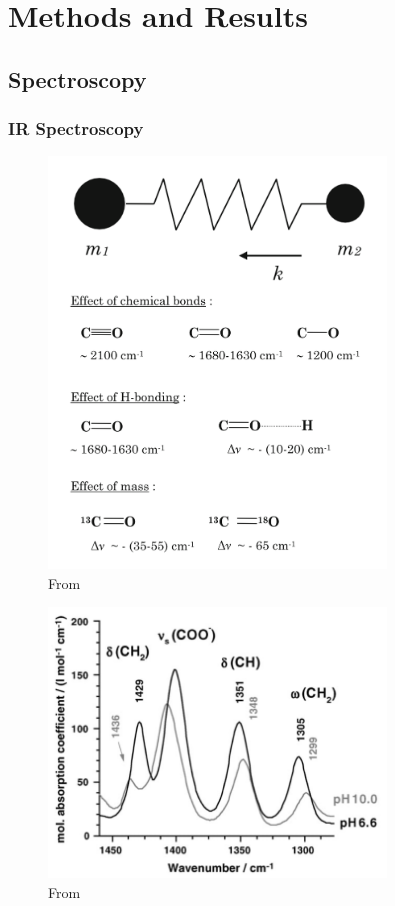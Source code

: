 \section{Methods and Results}
\subsection{Spectroscopy}
\subsubsection{IR Spectroscopy}
\begin{figure}[htbp]
  \centering
  \includegraphics[width=0.8\textwidth]{Images/IR_Basics.png}
  \caption{From \cite{berthomieu_fourier_2009}}
  \label{fig:my-label}
\end{figure}

\begin{figure}[htbp]
  \centering
  \includegraphics[width=0.8\textwidth]{Images/Cystine_IR_pH_dep.png}
  \caption{From \cite{wolpert_infrared_2006}}
  \label{fig:my-label}
\end{figure}

